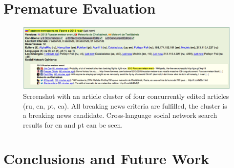 \documentclass{sig-alternate}
\begin{document}
\section{Premature Evaluation}

\begin{figure}
  \centering
  \includegraphics[width=1\linewidth]{./wikipedia-live-monitor.png}
  \caption{Screenshot with
    an article cluster of four concurrently edited articles (ru, en, pt, ca).
    All breaking news criteria are fulfilled, the cluster is a breaking news candidate.
    Cross-language social network search results for en and pt can be seen.}
  \label{fig:screenshot}
\end{figure}


\section{Conclusions and Future Work}

\balancecolumns



\balancecolumns
\end{document}
